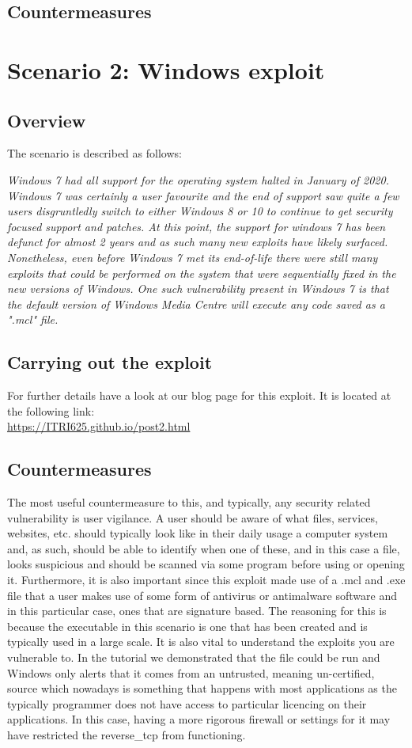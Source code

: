 \documentclass[a4paper, 12pt, titlepage]{report}
\begin{document}
\section{Countermeasures}
\chapter{Scenario 2: Windows exploit}
\section{Overview}
The scenario is described as follows:
\begin{displayquote}
\textit{Windows 7 had all support for the operating system halted in January of 2020. Windows 7 was certainly a user favourite and the end of support saw quite a few users disgruntledly switch to either Windows 8 or 10 to continue to get security focused support and patches. At this point, the support for windows 7 has been defunct for almost 2 years and as such many new exploits have likely surfaced. Nonetheless, even before Windows 7 met its end-of-life there were still many exploits that could be performed on the system that were sequentially fixed in the new versions of Windows. One such vulnerability present in Windows 7 is that the default version of Windows Media Centre will execute any code saved as a ".mcl" file.}
\end{displayquote}
\section{Carrying out the exploit}
For further details have a look at our blog page for this exploit. It is located at the following link:\\
\url{https://ITRI625.github.io/post2.html}
\section{Countermeasures}
The most useful countermeasure to this, and typically, any security related vulnerability is user vigilance. A user should be aware of what files, services, websites, etc. should typically look like in their daily usage a computer system and, as such, should be able to identify when one of these, and in this case a file, looks suspicious and should be scanned via some program before using or opening it.
Furthermore, it is also important since this exploit made use of a .mcl and .exe file that a user makes use of some form of antivirus or antimalware software and in this particular case, ones that are signature based. The reasoning for this is because the executable in this scenario is one that has been created and is typically used in a large scale. 
It is also vital to understand the exploits you are vulnerable to. In the tutorial we demonstrated that the file could be run and Windows only alerts that it comes from an untrusted, meaning un-certified, source which nowadays is something that happens with most applications as the typically programmer does not have access to particular licencing on their applications. In this case, having a more rigorous firewall or settings for it may have restricted the reverse\_tcp from functioning.
\end{document}
